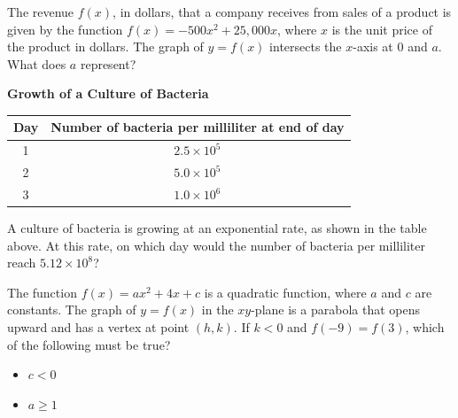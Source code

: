 The revenue $f(x)$, in dollars, that a company receives from sales of a product is given by the function  
$f(x) = -500x^2 + 25,\!000x$, where $x$ is the unit price of the product in dollars.  
The graph of $y = f(x)$ intersects the $x$-axis at $0$ and $a$.  
What does $a$ represent?

\vspace{0.75em}


\vspace{2em}

\noindent\markforreview
\vspace{1em}

\textbf{Growth of a Culture of Bacteria}  
\begin{center}
\begin{tabular}{|c|c|}
\hline
Day & Number of bacteria per milliliter at end of day \\
\hline
1 & $2.5 \times 10^5$ \\
2 & $5.0 \times 10^5$ \\
3 & $1.0 \times 10^6$ \\
\hline
\end{tabular}
\end{center}

A culture of bacteria is growing at an exponential rate, as shown in the table above.  
At this rate, on which day would the number of bacteria per milliliter reach $5.12 \times 10^8$?

\vspace{0.75em}


\vspace{2em}
\newpage
\noindent\markforreview
\vspace{1em}

The function $f(x) = ax^2 + 4x + c$ is a quadratic function, where $a$ and $c$ are constants.  
The graph of $y = f(x)$ in the $xy$-plane is a parabola that opens upward and has a vertex at point $(h, k)$.  
If $k < 0$ and $f(-9) = f(3)$, which of the following must be true?

\begin{itemize}
\item[I.] $c < 0$
\item[II.] $a \geq 1$
\end{itemize}

